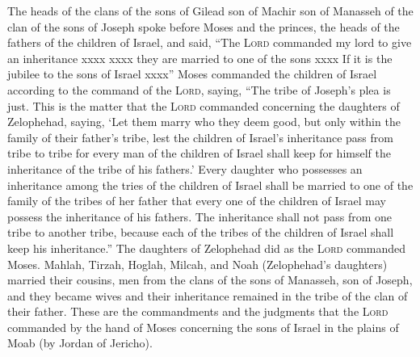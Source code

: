 
\begin{inparaenum}
   The heads of the clans of the sons of Gilead son of Machir son of Manasseh of the clan of the sons of Joseph spoke before Moses and the princes, the heads of the fathers of the children of Israel,%
   and said, ``The \textsc{Lord} commanded my lord to give an inheritance xxxx%
   xxxx they are married to one of the sons xxxx%
   If it is the jubilee to the sons of Israel xxxx''%
   Moses commanded the children of Israel according to the command of the \textsc{Lord}, saying, ``The tribe of Joseph's plea is just.%
   This is the matter that the \textsc{Lord} commanded concerning the daughters of Zelophehad, saying, `Let them marry who they deem good, but only within the family of their father's tribe,%
   lest the children of Israel's inheritance pass from tribe to tribe for every man of the children of Israel shall keep for himself the inheritance of the tribe of his fathers.'%
   Every daughter who possesses an inheritance among the tries of the children of Israel shall be married to one of the family of the tribes of her father that every one of the children of Israel may possess the inheritance of his fathers.%
   The inheritance shall not pass from one tribe to another tribe, because each of the tribes of the children of Israel shall keep his inheritance.''%
   The daughters of Zelophehad did as the \textsc{Lord} commanded Moses.%
   Mahlah, Tirzah, Hoglah, Milcah, and Noah (Zelophehad's daughters) married their cousins,%
   men from the clans of the sons of Manasseh, son of Joseph, and they became wives and their inheritance remained in the tribe of the clan of their father.%
   These are the commandments and the judgments that the \textsc{Lord} commanded by the hand of Moses concerning the sons of Israel in the plains of Moab (by Jordan of Jericho).%
\end{inparaenum}
